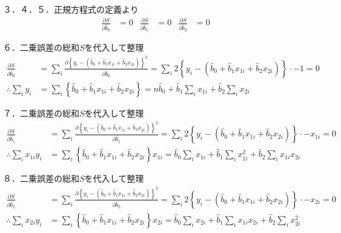 \documentclass{jsarticle}
\begin{document}
３．４．５．正規方程式の定義より
\begin{align*}
\frac{\partial S}{\partial \hat{b}_0}&=0&\frac{\partial S}{\partial \hat{b}_1}&=0&\frac{\partial S}{\partial \hat{b}_2}&=0
\end{align*}

６．二乗誤差の総和$S$を代入して整理
\begin{align*}
\frac{\partial S}{\partial \hat{b}_0}&=\sum_i \frac{\partial \left\{y_i-(\hat{b}_0+\hat{b}_1 x_{1i}+\hat{b}_2 x_{2i})\right\}^2}{\partial \hat{b}_0}=\sum_i 2\left\{y_i-(\hat{b}_0+\hat{b}_1 x_{1i}+\hat{b}_2 x_{2i})\right\}\cdot-1=0
\\
 \therefore \sum_i y_i &= \sum_i \left\{\hat{b}_0+\hat{b}_1 x_{1i}+\hat{b}_2 x_{2i}\right\}=n\hat{b}_0+\hat{b}_1 \sum_i x_{1i}+\hat{b}_2 \sum_i x_{2i}
\end{align*}

７．二乗誤差の総和$S$を代入して整理
\begin{align*}
\frac{\partial S}{\partial \hat{b}_1}&=\sum_i \frac{\partial \left\{y_i-(\hat{b}_0+\hat{b}_1 x_{1i}+\hat{b}_2 x_{2i})\right\}^2}{\partial \hat{b}_1}=\sum_i 2\left\{y_i-(\hat{b}_0+\hat{b}_1 x_{1i}+\hat{b}_2 x_{2i})\right\}\cdot-x_{1i}=0
\\
 \therefore \sum_i x_{1i} y_i &= \sum_i \left\{\hat{b}_0+\hat{b}_1 x_{1i}+\hat{b}_2 x_{2i}\right\}x_{1i}=\hat{b}_0\sum_i x_{1i}+\hat{b}_1 \sum_i x_{1i}^2+\hat{b}_2 \sum_i x_{1i} x_{2i}
\end{align*}

８．二乗誤差の総和$S$を代入して整理
\begin{align*}
\frac{\partial S}{\partial \hat{b}_2}&=\sum_i \frac{\partial \left\{y_i-(\hat{b}_0+\hat{b}_1 x_{1i}+\hat{b}_2 x_{2i})\right\}^2}{\partial \hat{b}_2}=\sum_i 2\left\{y_i-(\hat{b}_0+\hat{b}_1 x_{1i}+\hat{b}_2 x_{2i})\right\}\cdot-x_{2i}=0
\\
 \therefore \sum_i x_{2i} y_i &= \sum_i \left\{\hat{b}_0+\hat{b}_1 x_{1i}+\hat{b}_2 x_{2i}\right\}x_{2i}=\hat{b}_0\sum_i x_{2i}+\hat{b}_1 \sum_i x_{1i} x_{2i}+\hat{b}_2 \sum_i x_{2i}^2
\end{align*}
\end{document}
